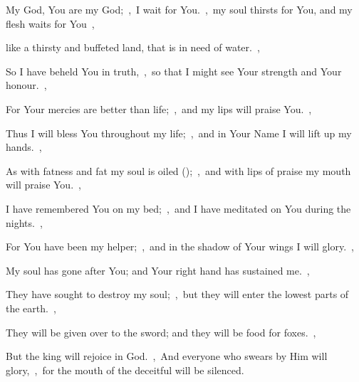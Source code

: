 \documentclass[12pt,twoside,a5paper]{article}
\begin{document}
\begin{normalparskip}
  My God, You are my God;~\sep\ I wait for You.~\sep\ my soul thirsts for You, and my flesh waits for You~\sep


  like a thirsty and buffeted land, that is in need of water.~\sep

  So I have beheld You in truth,~\sep\ so that I might see Your strength and Your honour.~\sep

  For Your mercies are better than life;~\sep\ and my lips will praise You.~\sep

  Thus I will bless You throughout my life;~\sep\ and in Your Name I will lift up my hands.~\sep

  As with fatness and fat my soul is oiled ();~\sep\ and with lips of praise my mouth will praise You.~\sep

  I have remembered You on my bed;~\sep\ and I have meditated on You during the nights.~\sep

  For You have been my helper;~\sep\ and in the shadow of Your wings I will glory.~\sep

  My soul has gone after You; and Your right hand has sustained me.~\sep

  They have sought to destroy my soul;~\sep\ but they will enter the lowest parts of the earth.~\sep

  They will be given over to the sword; and they will be food for foxes.~\sep

  But the king will rejoice in God.~\sep\ And everyone who swears by Him will glory,~\sep\ for the mouth of the deceitful will be silenced.
\end{normalparskip}

\end{document}
